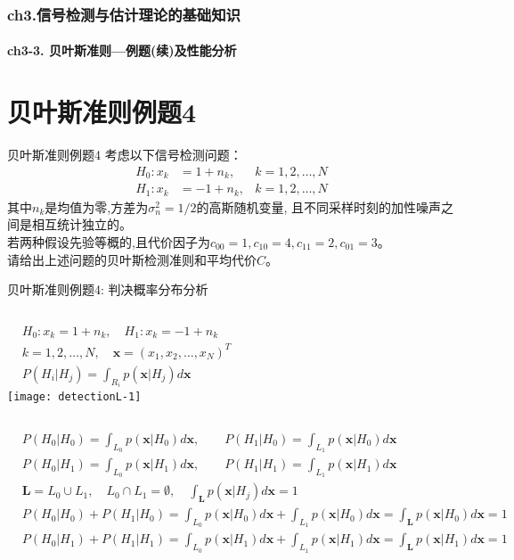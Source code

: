 \begin{frame}[shrink]
  \frametitle{ch3.信号检测与估计理论的基础知识}
  \framesubtitle{ch3-3. 贝叶斯准则---例题(续)及性能分析}
  \tableofcontents[hideallsubsections]
\end{frame}

\section{贝叶斯准则例题4}

\begin{frame}{贝叶斯准则例题4}
考虑以下信号检测问题：
\begin{align*}
H_0: x_k&=1+n_{k},   & k=1,2,\dots,N\\
H_1: x_k&=-1+n_{k}, & k=1,2,\dots,N
\end{align*}
其中$n_{k}$是均值为零,方差为$\sigma_n^2=1/2$的高斯随机变量,  且不同采样时刻的加性噪声之间是相互统计独立的。\\
若两种假设先验等概的,且代价因子为$c_{00}=1, c_{10}=4, c_{11}=2, c_{01}=3$。\\
请给出上述问题的贝叶斯检测准则和平均代价$C$。
\end{frame}

\begin{frame}[shrink]{贝叶斯准则例题4: 判决概率分布分析}
\begin{columns}
	\begin{align*}
	&H_0: x_k=1+n_k,\quad H_1: x_k=-1+n_k\\
	&k=1,2,\dots,N,\quad \bm{x}=(x_1,x_2,\dots,x_N)^{T}\\
	&P(H_i|H_j)=\int_{R_i}p(\bm{x}|H_j)d\bm{x}
	\end{align*}
	\texttt{[image: detectionL-1]}
\end{columns}
\begin{align*}
&P(H_0|H_0)=\int_{L_0}p(\bm{x}|H_0)d\bm{x},\qquad P(H_1|H_0)=\int_{L_1}p(\bm{x}|H_0)d\bm{x}\\
&P(H_0|H_1)=\int_{L_0}p(\bm{x}|H_1)d\bm{x},\qquad P(H_1|H_1)=\int_{L_1}p(\bm{x}|H_1)d\bm{x}\\
&\bm{L}=L_0\cup L_1,\quad L_0\cap L_1=\emptyset, \quad \int_{\bm{L}}p(\bm{x}|H_j)d\bm{x}=1\\
&P(H_0|H_0)+P(H_1|H_0)=\int_{L_0}p(\bm{x}|H_0)d\bm{x}+\int_{L_1}p(\bm{x}|H_0)d\bm{x}=\int_{\bm{L}}p(\bm{x}|H_0)d\bm{x}=1\\
&P(H_0|H_1)+P(H_1|H_1)=\int_{L_0}p(\bm{x}|H_1)d\bm{x}+\int_{L_1}p(\bm{x}|H_1)d\bm{x}=\int_{\bm{L}}p(\bm{x}|H_1)d\bm{x}=1
\end{align*}
\end{frame}

